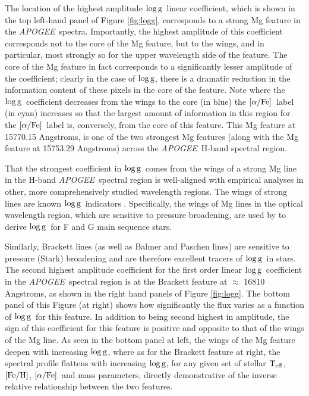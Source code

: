 \documentclass[12pt, preprint]{aastex}
\newcommand{\project}[1]{\textsl{#1}}
\newcommand{\apogee}{\project{APOGEE}}
\newcommand{\teff}{\mbox{$\rm T_{eff}$}}
\newcommand{\feh}{\mbox{$\rm [Fe/H]$}}
\newcommand{\alphafe}{\mbox{$\rm [\alpha/Fe]$}}
\newcommand{\logg}{\mbox{$\rm \log g$}}
\begin{document}
The location of the highest amplitude \logg\ linear coefficient, which is shown in the top left-hand panel of Figure \ref{fig:logg}, corresponds to a strong  Mg feature in the \apogee\ spectra. Importantly, the highest amplitude of this coefficient corresponds not to the core of the Mg feature, but to the wings, and in particular, most strongly so for the upper wavelength side of the feature. The core of the Mg feature in fact  corresponds to a significantly lesser amplitude of  the coefficient; clearly in the case of \logg,  there is a dramatic reduction in the information content of these pixels in the core of the feature. Note where the \logg\ coefficient decreases from the wings to the core (in blue) the \alphafe\ label (in cyan) increases so that the largest amount of information in this region for the \alphafe\ label is, conversely, from the core of this feature. This Mg feature at 15770.15 Angstroms, is one of the two strongest Mg features (along with the Mg feature at 15753.29 Angstroms) across the \apogee\ H-band spectral region. 

That the strongest coefficient in \logg\ comes from the wings of a strong Mg line in the H-band \apogee\ spectral region is well-aligned with empirical analyses in other, more comprehensively studied wavelength regions. The wings of strong lines are known \logg\ indicators \citep{Gray2008}. Specifically, the wings of Mg lines in the optical wavelength region, which are sensitive to pressure broadening, are used by \citet{F1997} to derive \logg\ for F and G main sequence stars.  

Similarly, Brackett lines (as well as Balmer and Paschen lines)  are sensitive to pressure (Stark) broadening and are therefore excellent tracers of \logg\ in stars. The second highest amplitude coefficient for the first order linear \logg\ coefficient in the \apogee\ spectral region is at the Brackett feature  at $\approx$ 16810 Angstroms, as shown in the right hand panels of Figure \ref{fig:logg}. The  bottom panel of this Figure (at right) shows how significantly the flux varies as a function of \logg\ for this feature. In addition to being second highest in amplitude, the sign of this coefficient for this feature is positive and opposite to that  of the wings of the Mg line. As seen in the bottom panel at left, the wings of the Mg feature deepen with increasing \logg, where as for the Brackett feature at right, the spectral profile flattens with increasing \logg, for any given set of stellar \teff, \feh, \alphafe\ and mass parameters, directly demonstrative of the inverse relative relationship between the two features. 
\end{document}
